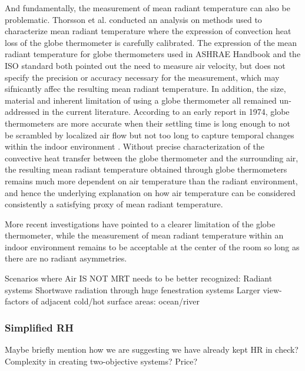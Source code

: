         And fundamentally, the measurement of mean radiant temperature can also be problematic. Thorsson et al. conducted an analysis on methods used to characterize mean radiant temperature where the expression of convection heat loss of the globe thermometer is carefully calibrated\cite{thorsson_different_2007}. The expression of the mean radiant temperature for globe thermometers used in ASHRAE Handbook \cite{american_society_of_heating_2013_2013} and the ISO standard both pointed out the need to measure air velocity, but does not specify the precision or accuracy necessary for the measurement, which may sifnicantly affec the resulting mean radiant temperature. In addition, the size, material and inherent limitation of using a globe thermometer all remained un-addressed in the current literature. According to an early report in 1974, globe thermometers are more accurate when their settling time is long enough to not be scrambled by localized air flow but not too long to capture temporal changes within the indoor environment \cite{graves_globe_1974}. Without precise characterization of the convective heat transfer between the globe thermometer and the surrounding air, the resulting mean radiant temperature obtained through globe thermometers remains much more dependent on air temperature than the radiant environment, and hence the underlying explanation on how air temperature can be considered consistently a satisfying proxy of mean radiant temperature. 
 

        More recent investigations have pointed to a clearer limitation of the globe thermometer, while the measurement of mean radiant temperature within an indoor environment remains to be acceptable at the center of the room \cite{dambrosio_alfano_measurement_2013} so long as there are no radiant asymmetries. 

        

            Scenarios where Air IS NOT MRT needs to be better recognized:
            Radiant systems
            Shortwave radiation through huge fenestration systems
            Larger view-factors of adjacent cold/hot surface areas: ocean/river
\subsubsection{Simplified RH}
        Maybe briefly mention how we are suggesting we have already kept HR in check?
        Complexity in creating two-objective systems? Price?

